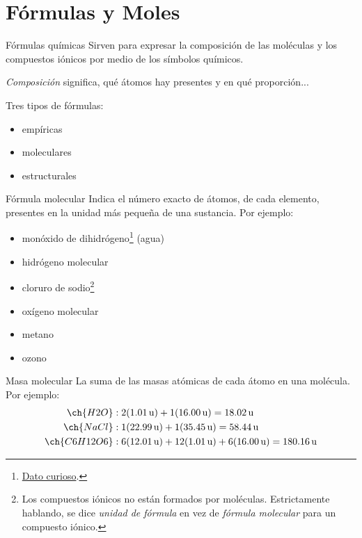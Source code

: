 \documentclass{beamer}
\begin{document}
  \section{Fórmulas y Moles}
  \begin{frame}{Fórmulas químicas}
    Sirven para expresar la composición de las moléculas y los compuestos iónicos por medio de los símbolos químicos.\par 
    \emph{Composición} significa, qué átomos hay presentes y en qué proporción...\par
    Tres tipos de fórmulas:
    \begin{itemize}
      \item empíricas
      \item moleculares
      \item estructurales
    \end{itemize}
  \end{frame}
  \begin{frame}{Fórmula molecular}
    Indica el número exacto de átomos, de cada elemento, presentes en la unidad más pequeña de una sustancia. Por ejemplo:
    \begin{itemize}
      \item {} monóxido de dihidrógeno\footnote{\href{https://en.wikipedia.org/wiki/Dihydrogen_monoxide_parody}{Dato curioso}.} (agua)
      \item {} hidrógeno molecular
      \item {} cloruro de sodio\footnote{Los compuestos iónicos no están formados por moléculas. Estrictamente hablando, se dice \emph{unidad de fórmula}  en vez de \emph{fórmula molecular} para un compuesto iónico.}
      \item {} oxígeno molecular
      \item {} metano
      \item {} ozono
    \end{itemize} 
  \end{frame}
  \begin{frame}{Masa molecular}
    La suma de las masas atómicas de cada átomo en una molécula. 
    Por ejemplo:
    \begin{align*}
      \ch{H2O}&: 2(1.01 \,\text{u}) + 1(16.00\,\text{u})  = 18.02 \,\text{u} \\
      \ch{NaCl}&: 1(22.99 \,\text{u}) + 1(35.45 \,\text{u}) = 58.44 \,\text{u} \\
      \ch{C6H12O6}&: 6(12.01 \,\text{u}) + 12(1.01 \,\text{u}) + 6(16.00 \,\text{u}) = 180.16 \,\text{u}
    \end{align*}
  \end{frame}
\end{document}

